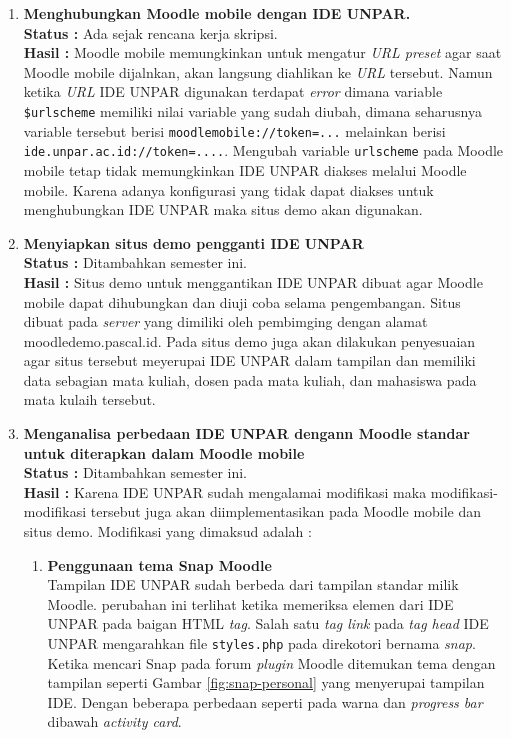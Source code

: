 \documentclass[a4paper,twoside]{article}
\begin{document}
\begin{enumerate}
		\item \textbf{Menghubungkan Moodle mobile dengan IDE UNPAR.}\\
		{\bf Status :} Ada sejak rencana kerja skripsi.\\
		{\bf Hasil :} Moodle mobile memungkinkan untuk mengatur \textit{URL preset} agar saat Moodle mobile dijalnkan, akan langsung diahlikan ke \textit{URL} tersebut. Namun ketika \textit{URL} IDE UNPAR digunakan terdapat \textit{error} dimana variable \texttt{\$urlscheme} memiliki nilai variable yang sudah diubah, dimana seharusnya variable tersebut berisi \texttt{moodlemobile://token=...} melainkan berisi \texttt{ide.unpar.ac.id://token=....}. Mengubah variable \texttt{urlscheme} pada Moodle mobile tetap tidak memungkinkan  IDE UNPAR diakses melalui Moodle mobile. Karena  adanya konfigurasi yang tidak dapat diakses untuk menghubungkan IDE UNPAR maka situs demo akan digunakan.

		\item \textbf{Menyiapkan situs demo pengganti IDE UNPAR}\\
		{\bf Status :} Ditambahkan semester ini.\\
		{\bf Hasil :} Situs demo untuk menggantikan IDE UNPAR dibuat agar Moodle mobile dapat dihubungkan dan diuji coba selama pengembangan. Situs dibuat pada \textit{server} yang dimiliki oleh pembimging dengan alamat moodledemo.pascal.id. Pada situs demo juga akan dilakukan penyesuaian agar situs tersebut meyerupai IDE UNPAR dalam tampilan dan memiliki data sebagian mata kuliah, dosen pada mata kuliah, dan mahasiswa pada mata kulaih tersebut.

		\item \textbf{Menganalisa perbedaan IDE UNPAR dengann Moodle standar untuk diterapkan dalam Moodle mobile}\\
		{\bf Status :} Ditambahkan semester ini.\\
		{\bf Hasil :} Karena IDE UNPAR sudah mengalamai modifikasi maka modifikasi-modifikasi tersebut juga akan diimplementasikan pada Moodle mobile dan situs demo. Modifikasi yang dimaksud adalah : 
\begin{enumerate}
\item \textbf{Penggunaan tema Snap Moodle} \\
	Tampilan IDE UNPAR sudah berbeda dari tampilan standar milik Moodle. perubahan ini terlihat ketika memeriksa elemen dari IDE UNPAR pada baigan HTML \textit{tag}. Salah satu \textit{tag link} pada \textit{tag head} IDE UNPAR mengarahkan file \texttt{styles.php} pada direkotori bernama \textit{snap}. Ketika mencari Snap pada forum \textit{plugin} Moodle ditemukan tema dengan tampilan seperti Gambar \ref{fig:snap-personal} yang menyerupai tampilan IDE. Dengan beberapa perbedaan seperti pada warna dan \textit{progress bar} dibawah \textit{activity card}.


\end{enumerate}
\end{enumerate}
\end{document}
